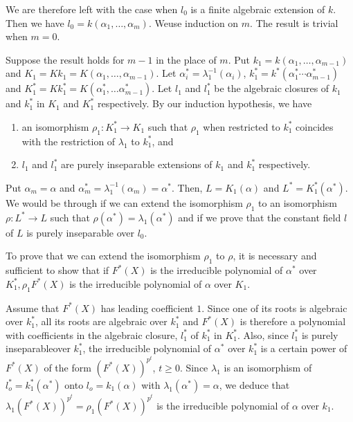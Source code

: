  We are therefore left with the case when $l_0$ is a finite algebraic
 extension of $k$. Then we have $l_0 = k(\alpha_1 , \ldots ,
 \alpha_m)$. We\pageoriginale use induction on $m$. The result is trivial when $m =
 0$. 
 
 Suppose the result holds for $m - 1$ in the place of $m$. Put $k_1 =
 k(\alpha_1, \ldots ,\alpha_{m - 1})$ and $K_1 = K k_1 =  K(\alpha_1 ,
 \ldots , \alpha_{m-1})$. Let $\alpha^*_i = \lambda^{-1}_1 (\alpha_i)$,\break
$k_1^* = k^* (\alpha^*_1 \cdots \alpha^*_{m-1})$ and $K_1^* = K k_1^* =
 K (\alpha^*_1, \ldots \alpha^*_{m-1})$. Let $l_1$ and $l_1^*$ be the
 algebraic closures of $k_1$ and $k^*_1$ in $K_1$ and $K^*_1$
 respectively. By our induction hypothesis, we have 
 \begin{enumerate} [(1)]
\item an isomorphism $\rho_1: K^*_1 \to K_1$ such that $\rho_1$ when
  restricted to $k^*_1$ coincides with the restriction of $\lambda_1$
  to $k^*_1$, and  
\item $l_1$ and $l^*_1$ are purely inseparable extensions of $k_1$ and
  $k^*_1$ respectively. 
 \end{enumerate} 
 
 Put $\alpha_m = \alpha$ and $\alpha^*_m = \lambda^{-1}_1 (\alpha_m) =
 \alpha^*$. Then, $L = K_1 (\alpha)$ and $L^* = K^*_1 (\alpha^*)$. We
 would be through if we can extend the isomorphism $\rho_1$ to an
 isomorphism $\rho : L^* \to L$ such that $\rho (\alpha^*)= \lambda_1
 (\alpha^*)$ and if we prove that the constant field $l$ of $L$ is
 purely inseparable over $l_0$. 
 
 To prove that we can extend the isomorphism $\rho_1$ to $\rho$, it is
 necessary and sufficient to show that if $F^* (X)$ is the irreducible
 polynomial of $\alpha^*$ over $K^*_1, \rho_1 F^*(X)$ is the
 irreducible polynomial of $\alpha$ over $K_1$. 
 
 Assume that $F^* (X)$ has leading coefficient $1$. Since one of its
 roots is algebraic over $k^*_1$, all its roots are algebraic over
 $k^*_1$ and $F^* (X)$ is therefore a polynomial with coefficients in
 the algebraic closure, $l^*_1$ of $k^*_1$ in $K^*_1$. Also, since
 $l^*_1$ is purely inseparable\pageoriginale over $k^*_1$, the irreducible
 polynomial of $\alpha^*$ over $k^*_1$ is a certain power of $F^*(X)$
 of the form $(F^* (X))^{p^t}$, $t \ge 0$. Since $\lambda_1$ is an
 isomorphism of $l^*_o = k^*_1 (\alpha^*)$ onto $l_o = k_1(\alpha)$
 with $\lambda_1 (\alpha^*) = \alpha$, we deduce that $\lambda_1 (F^*
 (X))^{p^t}= \rho_1(F^*(X))^{p^t}$ is the irreducible polynomial of
 $\alpha$ over $k_1$. 
 
